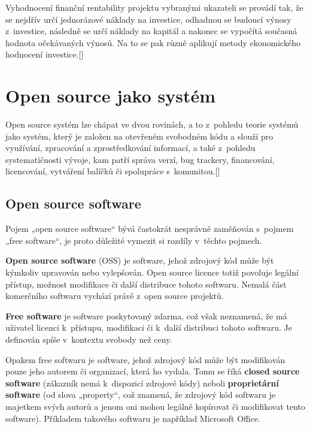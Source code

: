 \documentclass[
	11pt, oneside, printed, draft, 
	table,   %
	lof,     %
	lot     %
]{fithesis3}
\newcommand{\citepages}[2]{[\cite[#1]{#2}]}
\newcommand{\bold}[1]{\textbf{#1}}
\begin{document}
{Vyhodnocení finanční rentability projektu vybranými ukazateli se provádí tak, že se nejdřív určí jednorázové náklady na investice, odhadnou se budoucí výnosy z~investice, následně se určí náklady na kapitál a nakonec se vypočítá současná hodnota očekávaných výnosů. Na to se pak různě aplikují metody ekonomického hodnocení investice.\citepages{17-18}{Podesvova2010thesis}

\section{Open source jako systém}
Open source systém lze chápat ve dvou rovinách, a to z~pohledu teorie systémů jako systém, který je založen na otevřeném svobodném kódu a slouží pro využívání, zpracování a zprostředkování informací, a také z~pohledu systematičnosti vývoje, kam patří správa verzí, bug trackery, financování, licencování, vytváření balíčků či spolupráce s~komunitou.\citepages{40}{cejpek_2005}

\subsection{Open source software}

Pojem „open source software“ bývá častokrát nesprávně zaměňován s~pojmem „free software“, je proto důležité vymezit si rozdíly v~těchto pojmech. 

\bold{Open source software} (OSS) je software, jehož zdrojový kód může být kýmkoliv upravován nebo vylepšován. Open source licence totiž povoluje legální přístup, možnost modifikace či další distribuce tohoto softwaru. Nemalá část komerčního softwaru vychází právě z~open source projektů.

\bold{Free software} je software poskytovaný zdarma, což však neznamená, že má uživatel licenci k~přístupu, modifikaci či k~další distribuci tohoto softwaru. Je definován spíše v~kontextu svobody než ceny. 

Opakem free softwaru je software, jehož zdrojový kód může být modifikován pouze jeho autorem či organizací, která ho vydala. Tomu se říká \bold{closed source software} (zákazník nemá k~dispozicí zdrojové kódy) neboli \bold{proprietární software} (od slova „property“, což znamená, že zdrojový kód softwaru je majetkem svých autorů a jenom oni mohou legálně kopírovat či modifikovat tento software). Příkladem takového softwaru je například Microsoft Office.%

}
\end{document}
